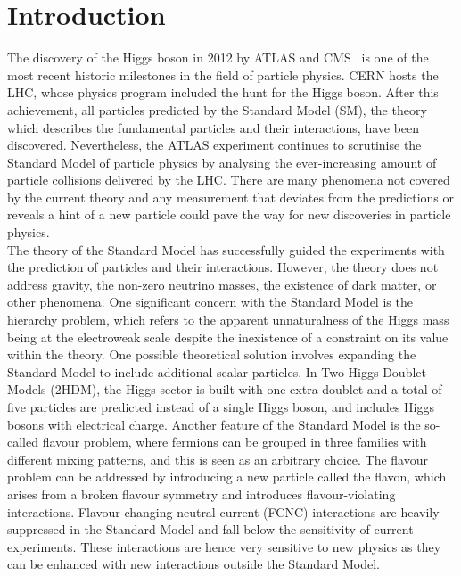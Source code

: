 \setchapterpreamble[u]{\margintoc}
\chapter*{Introduction}
The discovery of the Higgs boson in 2012 by ATLAS and CMS~\cite{ATLASHiggs2012,CMShiggs2012} is one of the most recent historic milestones in the field of particle physics. CERN hosts the LHC, whose physics program included the hunt for the Higgs boson. After this achievement, all particles predicted by the Standard Model (SM), the theory which describes the fundamental particles and their interactions, have been discovered. Nevertheless, the ATLAS experiment continues to scrutinise the Standard Model of particle physics by analysing the ever-increasing amount of particle collisions delivered by the LHC. There are many phenomena not covered by the current theory and any measurement that deviates from the predictions or reveals a hint of a new particle could pave the way for new discoveries in particle physics.\\

The theory of the Standard Model has successfully guided the experiments with the prediction of particles and their interactions. However, the theory does not address gravity, the non-zero neutrino masses, the existence of dark matter, or other phenomena. One significant concern with the Standard Model is the hierarchy problem, which refers to the apparent unnaturalness of the Higgs mass being at the electroweak scale despite the inexistence of a constraint on its value within the theory. One possible theoretical solution involves expanding the Standard Model to include additional scalar particles. In Two Higgs Doublet Models (2HDM), the Higgs sector is built with one extra doublet and a total of five particles are predicted instead of a single Higgs boson, and includes Higgs bosons with electrical charge.
Another feature of the Standard Model is the so-called flavour problem, where fermions can be grouped in three families with different mixing patterns, and this is seen as an arbitrary choice. The flavour problem can be addressed by introducing a new particle called the flavon, which arises from a broken flavour symmetry and introduces flavour-violating interactions. Flavour-changing neutral current (FCNC) interactions are heavily suppressed in the Standard Model and fall below the sensitivity of current experiments. These interactions are hence very sensitive to new physics as they can be enhanced with new interactions outside the Standard Model.\\

